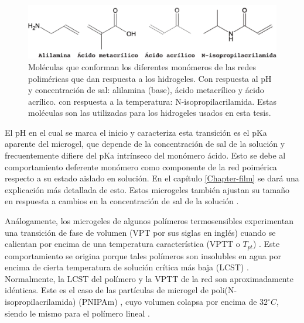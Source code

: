 \begin{figure}[!tb]
	\centering
	\includegraphics[width=0.9\linewidth]{Figures/modelos/acidos.pdf}
	\caption{Mol\'eculas  que conforman los diferentes mon\'omeros de las redes polim\'ericas que dan respuesta a los hidrogeles. Con respuesta al pH y concentraci\'on de sal: alilamina (base),  \'acido metacr\'ilico y \'acido acr\'ilico. con respuesta a la temperatura: N-isopropilacrilamida.
	Estas mol\'eculas son las utilizadas para los hidrogeles usados en esta tesis.}
	\label{fig:intro:acidos-aa-maa}
\end{figure}


El pH en el cual se marca el inicio y caracteriza esta transici\'on es el pKa aparente del microgel, que depende de la concentraci\'on de sal de la soluci\'on y frecuentemente difiere del pKa intr\'inseco del mon\'omero \'acido. Esto se debe al comportamiento deferente mon\'omero como componente de la red poim\'erica respecto a su estado aislado en soluci\'on. En el cap\'itulo \ref{Chapter-film} se dar\'a una explicaci\'on m\'as detallada de esto.
Estos microgeles tambi\'en ajustan su tama\~no en respuesta a cambios en la concentraci\'on de sal de la soluci\'on \cite{snowden1996colloidal}.
	
An\'alogamente, los microgeles de algunos pol\'imeros termosensibles experimentan una transici\'on de fase de volumen (VPT por sus siglas en ingl\'es) cuando se calientan por encima de una temperatura caracter\'istica (VPTT o $T_{pt}$) \cite{Pelton1986,Pelton2000}.
Este comportamiento se origina porque tales pol\'imeros son insolubles en agua por encima de cierta temperatura de soluci\'on cr\'itica m\'as baja (LCST) \cite{Kawaguchi2020}.
Normalmente, la LCST del pol\'imero y la VPTT de la red  son aproximadamente id\'enticas. 
Este es el caso de las part\'iculas de microgel de poli(N-isopropilacrilamida) (PNIPAm) \cite{Pelton1986}, cuyo volumen colapsa por encima de $32   ^\circ C$, siendo le mismo para el  pol\'imero lineal \cite{Schild1992}.
	
